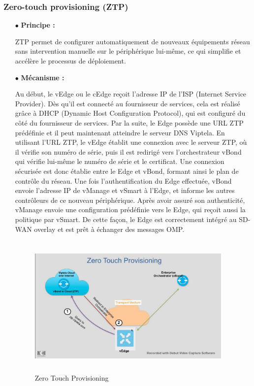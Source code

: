 \subsubsection{Zero-touch provisioning (ZTP)   }
\begin{itemize}
	\item[$\bullet$]\textbf{  Principe :} 
	
	ZTP permet de configurer automatiquement de nouveaux équipements réseau sans intervention manuelle sur le périphérique lui-même, ce qui  simplifie et accélère le processus de déploiement.
\end{itemize}
\begin{itemize}
	\item[$\bullet$]\textbf{Mécanisme :} 
	
	Au début, le vEdge ou le cEdge reçoit l'adresse IP de l'ISP (Internet Service Provider). Dès qu'il est connecté au fournisseur de services, cela est réalisé grâce à DHCP (Dynamic Host Configuration Protocol), qui est configuré du côté du fournisseur de services. Par la suite, le Edge possède une URL ZTP prédéfinie et il peut maintenant atteindre le serveur DNS Viptela. En utilisant l'URL ZTP, le vEdge établit une connexion avec le serveur ZTP, où il vérifie son numéro de série, puis il est redirigé vers l'orchestrateur vBond qui vérifie lui-même le numéro de série et le certificat. Une connexion sécurisée est donc établie entre le Edge et vBond, formant ainsi le plan de contrôle du réseau. Une fois l'authentification du Edge effectuée, vBond envoie l'adresse IP de vManage et vSmart à l'Edge, et informe les autres contrôleurs de ce nouveau périphérique. Après avoir assuré son authenticité, vManage envoie une configuration prédéfinie vers le Edge, qui reçoit aussi la politique par vSmart. De cette façon, le Edge est correctement intégré au SD-WAN overlay et est prêt à échanger des messages OMP.
	
\begin{figure} [H]
	\begin{center}
		\centering
		\hspace*{-0.5cm}
		\includegraphics[height=7cm,width=10cm]{image/zttp}
	\end{center}
	\caption{Zero Touch Provisioning}
\end{figure} 
\end{itemize}
